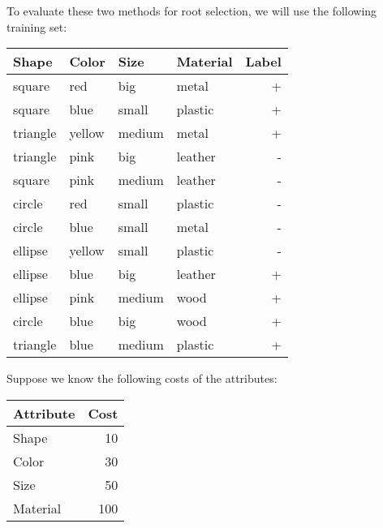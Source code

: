 To evaluate these two methods for root selection, we will use the
following training set:
\begin{center}
  \begin{tabular}{llll|r}
    \hline
    Shape    & Color  & Size   & Material & Label \\ \hline
    square   & red    & big    & metal    & +     \\
    square   & blue   & small  & plastic  & +     \\
    triangle & yellow & medium & metal    & +     \\
    triangle & pink   & big    & leather  & -     \\
    square   & pink   & medium & leather  & -     \\
    circle   & red    & small  & plastic  & -     \\
    circle   & blue   & small  & metal    & -     \\
    ellipse  & yellow & small  & plastic  & -     \\
    ellipse  & blue   & big    & leather  & +     \\
    ellipse  & pink   & medium & wood     & +     \\
    circle   & blue   & big    & wood     & +     \\
    triangle & blue   & medium & plastic  & +     \\  \hline
  \end{tabular}
\end{center}

Suppose we know the following costs of the attributes:
\begin{center}
  \begin{tabular}{lr}
    Attribute & Cost \\\hline
    Shape     & 10   \\
    Color     & 30   \\
    Size      & 50   \\
    Material  & 100  \\\hline
  \end{tabular}
\end{center}

